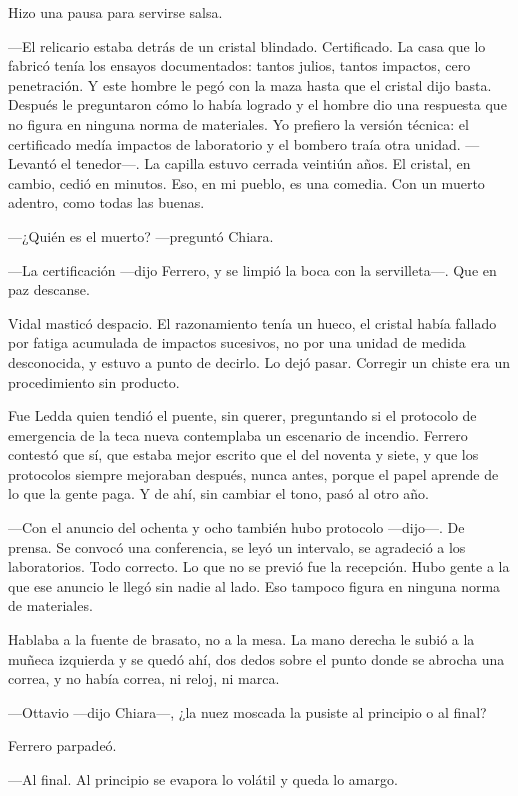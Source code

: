 Hizo una pausa para servirse salsa.

---El relicario estaba detrás de un cristal blindado. Certificado. La casa que lo fabricó tenía los ensayos documentados: tantos julios, tantos impactos, cero penetración. Y este hombre le pegó con la maza hasta que el cristal dijo basta. Después le preguntaron cómo lo había logrado y el hombre dio una respuesta que no figura en ninguna norma de materiales. Yo prefiero la versión técnica: el certificado medía impactos de laboratorio y el bombero traía otra unidad. ---Levantó el tenedor---. La capilla estuvo cerrada veintiún años. El cristal, en cambio, cedió en minutos. Eso, en mi pueblo, es una comedia. Con un muerto adentro, como todas las buenas.

---¿Quién es el muerto? ---preguntó Chiara.

---La certificación ---dijo Ferrero, y se limpió la boca con la servilleta---. Que en paz descanse.

Vidal masticó despacio. El razonamiento tenía un hueco, el cristal había fallado por fatiga acumulada de impactos sucesivos, no por una unidad de medida desconocida, y estuvo a punto de decirlo. Lo dejó pasar. Corregir un chiste era un procedimiento sin producto.

Fue Ledda quien tendió el puente, sin querer, preguntando si el protocolo de emergencia de la teca nueva contemplaba un escenario de incendio. Ferrero contestó que sí, que estaba mejor escrito que el del noventa y siete, y que los protocolos siempre mejoraban después, nunca antes, porque el papel aprende de lo que la gente paga. Y de ahí, sin cambiar el tono, pasó al otro año.

---Con el anuncio del ochenta y ocho también hubo protocolo ---dijo---. De prensa. Se convocó una conferencia, se leyó un intervalo, se agradeció a los laboratorios. Todo correcto. Lo que no se previó fue la recepción. Hubo gente a la que ese anuncio le llegó sin nadie al lado. Eso tampoco figura en ninguna norma de materiales.

Hablaba a la fuente de brasato, no a la mesa. La mano derecha le subió a la muñeca izquierda y se quedó ahí, dos dedos sobre el punto donde se abrocha una correa, y no había correa, ni reloj, ni marca.

---Ottavio ---dijo Chiara---, ¿la nuez moscada la pusiste al principio o al final?

Ferrero parpadeó.

---Al final. Al principio se evapora lo volátil y queda lo amargo.

